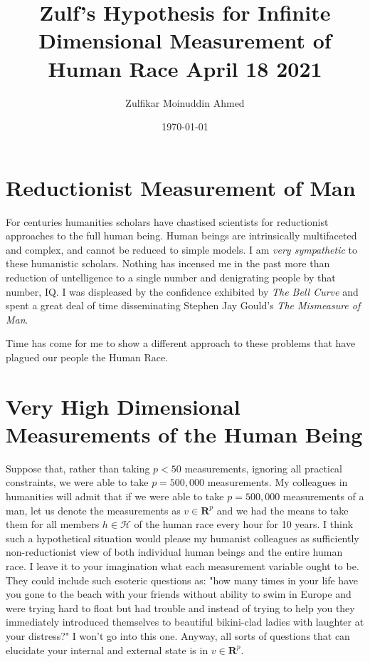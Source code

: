 \documentclass{amsart}
\title{Zulf's Hypothesis for Infinite Dimensional Measurement of Human Race April 18 2021}
\author{Zulfikar Moinuddin Ahmed}
\date{\today}
\begin{document}
\maketitle

\section{Reductionist Measurement of Man}

For centuries humanities scholars have chastised scientists for reductionist approaches to the full human being.  Human beings are intrinsically multifaceted and complex, and cannot be reduced to simple models.  I am {\em very sympathetic} to these humanistic scholars. Nothing has incensed me in the past more than reduction of untelligence to a single number and denigrating people by that number, IQ.  I was displeased by the confidence exhibited by {\em The Bell Curve} and spent a great deal of time disseminating Stephen Jay Gould's {\em The Mismeasure of Man}.  

Time has come for me to show a different approach to these problems that have plagued our people the Human Race.

\section{Very High Dimensional Measurements of the Human Being}

Suppose that, rather than taking $p<50$ measurements, ignoring all practical constraints, we were able to take $p=500,000$ measurements.  My colleagues in humanities will admit that if we were able to take $p=500,000$ measurements of a man, let us denote the measurements as $v \in \mathbf{R}^p$ and we had the means to take them for all members $h \in \mathcal{H}$ of the human race every hour for 10 years.  I think such a hypothetical situation would please my humanist colleagues as sufficiently non-reductionist view of both individual human beings and the entire human race.  I leave it to your imagination what each measurement variable ought to be.  They could include such esoteric questions as:  "how many times in your life have you gone to the beach with your friends without ability to swim in Europe and were trying hard to float but had trouble and instead of trying to help you they immediately introduced themselves to beautiful bikini-clad ladies with laughter at your distress?"  I won't go into this one.  Anyway, all sorts of questions that can elucidate your internal and external state is in $v \in \mathbf{R}^p$.
\end{document}
